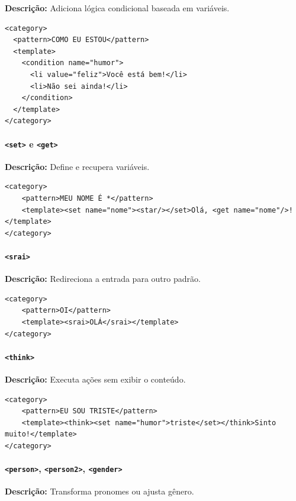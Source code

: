 \documentclass[14pt,a4paper,oneside]{book}
\begin{document}
\textbf{Descrição:} Adiciona lógica condicional baseada em variáveis. 

\begin{lstlisting}
<category>
  <pattern>COMO EU ESTOU</pattern>
  <template>
    <condition name="humor">
      <li value="feliz">Você está bem!</li>
      <li>Não sei ainda!</li>
    </condition>
  </template>
</category>
\end{lstlisting}

\paragraph{\texttt{<set>} e \texttt{<get>}} 

\textbf{Descrição:} Define e recupera variáveis. 

\begin{lstlisting}
<category>
	<pattern>MEU NOME É *</pattern>
	<template><set name="nome"><star/></set>Olá, <get name="nome"/>!</template>
</category>
\end{lstlisting}

\paragraph{\texttt{<srai>}} 

\textbf{Descrição:} Redireciona a entrada para outro padrão. 

\begin{lstlisting}
<category>
	<pattern>OI</pattern>
	<template><srai>OLÁ</srai></template>
</category>
\end{lstlisting}

\paragraph{\texttt{<think>}} 

\textbf{Descrição:} Executa ações sem exibir o conteúdo. 

\begin{lstlisting}
<category>
	<pattern>EU SOU TRISTE</pattern>
	<template><think><set name="humor">triste</set></think>Sinto muito!</template>
</category>
\end{lstlisting}

\paragraph{\texttt{<person>}, \texttt{<person2>}, \texttt{<gender>}} 

\textbf{Descrição:} Transforma pronomes ou ajusta gênero. 
\end{document}
